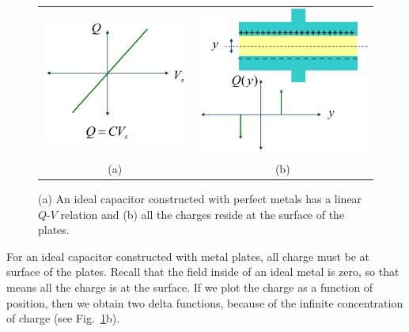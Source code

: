 \begin{figure}[tb]
\centering
\begin{tabular}{cc}
\includegraphics[width=.35\columnwidth]{mod2-2_ICtech_sld_19} &
\includegraphics[width=.35\columnwidth]{mod2-2_ICtech_sld_19b}\\
(a) & (b)\\
\end{tabular}
\caption{(a) An ideal capacitor constructed with perfect metals has a linear $Q$-$V$ relation and (b) all the charges reside at the surface of the plates.}
\label{fig:mod2-2_ICtech_sld_19}
\end{figure}
For an ideal capacitor constructed with metal plates, all charge must be at surface of the plates.  Recall that the field inside of an ideal metal is zero, so that means all the charge is at the surface.  If we plot the charge as a function of position, then we obtain two delta functions, because of the infinite concentration of charge (see Fig.~\ref{fig:mod2-2_ICtech_sld_19}b).
